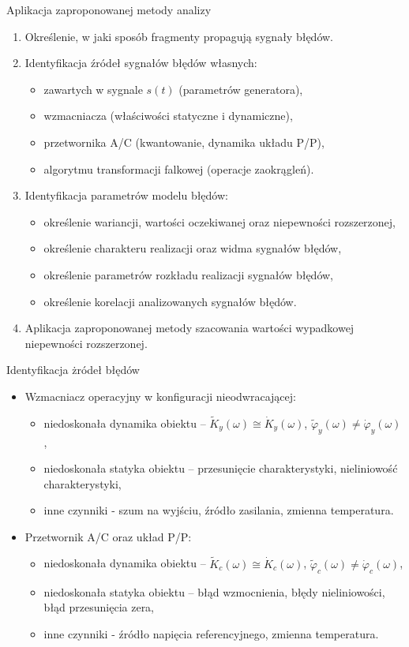 \documentclass[12pt, polish, aspectratio = 169]{slides}
\begin{document}
\begin{frame}{Aplikacja zaproponowanej metody analizy}
\begin{enumerate}
\item Określenie, w jaki sposób fragmenty propagują sygnały błędów.
\item Identyfikacja źródeł sygnałów błędów własnych:
	\begin{itemize}
	\item zawartych w sygnale $s(t)$ (parametrów generatora),
	\item wzmacniacza (właściwości statyczne i dynamiczne),
	\item przetwornika A/C (kwantowanie, dynamika układu P/P),
	\item algorytmu transformacji falkowej (operacje zaokrągleń).
	\end{itemize}
\item Identyfikacja parametrów modelu błędów:
	\begin{itemize}
	\item określenie wariancji, wartości oczekiwanej oraz niepewności rozszerzonej,
	\item określenie charakteru realizacji oraz widma sygnałów błędów,
	\item określenie parametrów rozkładu realizacji sygnałów błędów,
	\item określenie korelacji analizowanych sygnałów błędów.
	\end{itemize}
\item Aplikacja zaproponowanej metody szacowania wartości wypadkowej niepewności rozszerzonej.
\end{enumerate}
\end{frame}

\begin{frame}{Identyfikacja żródeł błędów}
\begin{itemize}
\item Wzmacniacz operacyjny w konfiguracji nieodwracającej:
	\begin{itemize}
	\item niedoskonała dynamika obiektu -- $\tilde{K}_{y}(\omega) \cong \dot{K}_{y}(\omega)$, $\tilde{\varphi}_{y}(\omega) \ne \dot{\varphi}_{y}(\omega)$,
	\item niedoskonała statyka obiektu -- przesunięcie charakterystyki, nieliniowość charakterystyki,
	\item inne czynniki - szum na wyjściu, źródło zasilania, zmienna temperatura.
	\end{itemize}
\item Przetwornik A/C oraz układ P/P:
	\begin{itemize}
	\item niedoskonała dynamika obiektu -- $\tilde{K}_{c}(\omega) \cong \dot{K}_{c}(\omega)$, $\tilde{\varphi}_{c}(\omega) \ne \dot{\varphi}_{c}(\omega)$,
	\item niedoskonała statyka obiektu -- błąd wzmocnienia, błędy nieliniowości, błąd przesunięcia zera,
	\item inne czynniki - źródło napięcia referencyjnego, zmienna temperatura.
	\end{itemize}
\end{itemize}
\end{frame}
\end{document}
